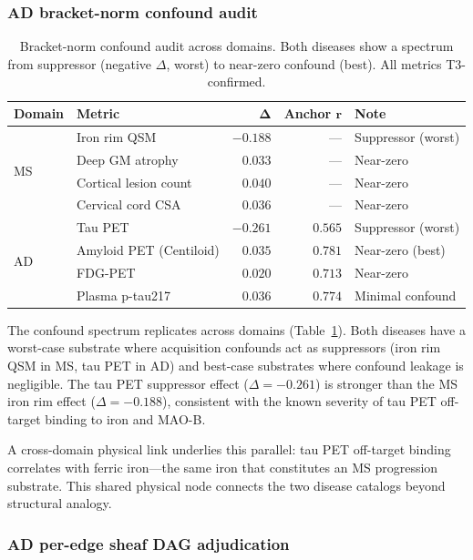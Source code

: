 \documentclass[11pt]{article}
\begin{document}
\subsubsection{AD bracket-norm confound audit}

\begin{table}[t]
\centering
\caption{Bracket-norm confound audit across domains. Both diseases show a spectrum from suppressor (negative $\Delta$, worst) to near-zero confound (best). All metrics T3-confirmed.}
\label{tab:p1-cross}
\small
\begin{tabular}{@{}llrrl@{}}
\toprule
\textbf{Domain} & \textbf{Metric} & $\boldsymbol{\Delta}$ & \textbf{Anchor} $\boldsymbol{r}$ & \textbf{Note} \\
\midrule
\multirow{4}{*}{MS}
& Iron rim QSM & $-0.188$ & --- & Suppressor (worst) \\
& Deep GM atrophy & $0.033$ & --- & Near-zero \\
& Cortical lesion count & $0.040$ & --- & Near-zero \\
& Cervical cord CSA & $0.036$ & --- & Near-zero \\
\midrule
\multirow{4}{*}{AD}
& Tau PET & $-0.261$ & $0.565$ & Suppressor (worst) \\
& Amyloid PET (Centiloid) & $0.035$ & $0.781$ & Near-zero (best) \\
& FDG-PET & $0.020$ & $0.713$ & Near-zero \\
& Plasma p-tau217 & $0.036$ & $0.774$ & Minimal confound \\
\bottomrule
\end{tabular}
\end{table}

The confound spectrum replicates across domains (Table~\ref{tab:p1-cross}).
Both diseases have a worst-case substrate where acquisition confounds act as suppressors (iron rim QSM in MS, tau PET in AD) and best-case substrates where confound leakage is negligible.
The tau PET suppressor effect ($\Delta = -0.261$) is stronger than the MS iron rim effect ($\Delta = -0.188$), consistent with the known severity of tau PET off-target binding to iron and MAO-B.

A cross-domain physical link underlies this parallel: tau PET off-target binding correlates with ferric iron---the same iron that constitutes an MS progression substrate.
This shared physical node connects the two disease catalogs beyond structural analogy.

\subsubsection{AD per-edge sheaf DAG adjudication}
\end{document}
